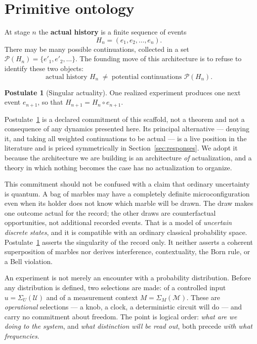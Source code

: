 \documentclass[11pt,a4paper]{article}
\theoremstyle{definition}
\newtheorem{postulate}{Postulate}
\theoremstyle{plain}
\theoremstyle{remark}
\begin{document}
\section{Primitive ontology}
\label{sec:ontology}

At stage $n$ the \textbf{actual history} is a finite sequence of events
\begin{equation}
H_n = (e_1, e_2, \ldots, e_n).
\end{equation}
There may be many possible continuations, collected in a set
$\mathcal{P}(H_n) = \{e'_1, e'_2, \ldots\}$. The founding move of this
architecture is to refuse to identify these two objects:
\begin{equation}
\text{actual history } H_n \;\neq\; \text{potential continuations }
\mathcal{P}(H_n).
\label{eq:distinction}
\end{equation}

\begin{postulate}[Singular actuality]
\label{post:A}
One realized experiment produces one next event $e_{n+1}$, so that
$H_{n+1} = H_n \circ e_{n+1}$.
\end{postulate}

\noindent Postulate~\ref{post:A} is a declared commitment of this
scaffold, not a theorem and not a consequence of any dynamics presented
here. Its principal alternative --- denying it, and taking all weighted
continuations to be actual --- is a live position in the literature and
is priced symmetrically in Section~\ref{sec:responses}. We adopt it
because the architecture we are building is an architecture \emph{of}
actualization, and a theory in which nothing becomes the case has no
actualization to organize.

This commitment should not be confused with a claim that ordinary
uncertainty is quantum. A bag of marbles may have a completely definite
microconfiguration even when its holder does not know which marble will be
drawn. The draw makes one outcome actual for the record; the other draws are
counterfactual opportunities, not additional recorded events. That is a
model of \emph{uncertain discrete states}, and it is compatible with an
ordinary classical probability space. Postulate~\ref{post:A} asserts the
singularity of the record only. It neither asserts a coherent superposition
of marbles nor derives interference, contextuality, the Born rule, or a Bell
violation.

An experiment is not merely an encounter with a probability
distribution. Before any distribution is defined, two selections are
made: of a controlled input $u = \Sigma_U(\mathcal{U})$ and of a
measurement context $M = \Sigma_M(\mathcal{M})$. These are
\emph{operational} selections --- a knob, a clock, a deterministic
circuit will do --- and carry no commitment about freedom. The point is
logical order: \emph{what are we doing to the system}, and \emph{what
distinction will be read out}, both precede \emph{with what
frequencies}.
\end{document}
